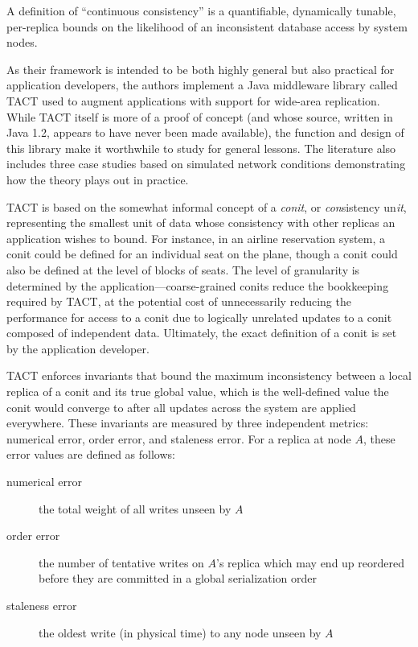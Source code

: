 A definition of ``continuous
consistency'' is a quantifiable, dynamically tunable, per-replica
bounds on the likelihood of an inconsistent database access by system
nodes.

As their framework is intended to be both highly general but
also practical for application developers, the authors implement a
Java middleware library called TACT used to augment applications with
support for wide-area replication. While TACT itself is more of a
proof of concept (and whose source, written in Java 1.2, appears to
have never been made available), the function and design of this
library make it worthwhile to study for general lessons. The
literature also includes three case studies based on simulated network
conditions demonstrating how the theory plays out in practice.
\cite{2002tact}

TACT is based on the somewhat informal concept of a \emph{conit}, or
\emph{con}sistency un\emph{it}, representing the smallest unit of data
whose consistency with other replicas an application wishes to
bound. For instance, in an airline reservation system, a conit could
be defined for an individual seat on the plane, though a conit could
also be defined at the level of blocks of seats. The level of
granularity is determined by the application---coarse-grained conits
reduce the bookkeeping required by TACT, at the potential cost of
unnecessarily reducing the performance for access to a conit due to
logically unrelated updates to a conit composed of independent data.
Ultimately, the exact definition of a conit is set by the application
developer.

TACT enforces invariants that bound the maximum inconsistency between
a local replica of a conit and its true global value, which is the
well-defined value the conit would converge to after all updates
across the system are applied everywhere. These invariants are
measured by three independent metrics: numerical error, order error,
and staleness error. For a replica at node $A$, these error values are
defined as follows:

\begin{description}
   \item[numerical error] the total weight of all writes unseen by $A$
   \item[order error] the number of tentative writes on $A$'s replica
     which may end up reordered before they are committed in a global
     serialization order
   \item[staleness error] the oldest write (in physical time) to any
     node unseen by $A$
\end{description}

